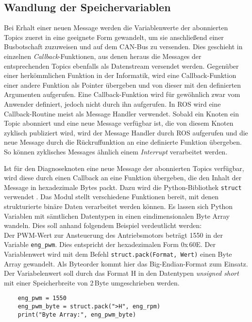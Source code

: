 \subsection{Wandlung der Speichervariablen} \label{subsec:WandlungSpeichervariblen}
Bei Erhalt einer neuen Message werden die Variablenwerte der abonnierten Topics zuerst in eine geeignete Form gewandelt, um sie anschließend einer Busbotschaft zuzuweisen und auf dem CAN-Bus zu versenden. Dies geschieht in einzelnen \emph{Callback}-Funktionen, aus denen heraus die Messages der entsprechenden Topics ebenfalls als Datenstream versendet werden. Gegenüber einer herkömmlichen Funktion in der Informatik, wird eine Callback-Funktion einer andere Funktion als Pointer übergeben und von dieser mit den definierten Argumenten aufgerufen. Eine Callback-Funktion wird für gewöhnlich zwar vom Anwender definiert, jedoch nicht durch ihn aufgerufen. In ROS wird eine Callback-Routine meist als Message Handler verwendet. Sobald ein Knoten ein Topic abonniert und eine neue Message verfügbar ist, die von diesem Knoten zyklisch publiziert wird, wird der Message Handler durch ROS aufgerufen und die neue Message durch die Rückruffunktion an eine definierte Funktion übergeben. So können zyklisches Messages ähnlich einem \emph{Interrupt} verarbeitet werden.

Ist für den Diagnoseknoten eine neue Message der abonnierten Topics verfügbar, wird diese durch einen Callback an eine Funktion übergeben, die den Inhalt der Message in hexadezimale Bytes packt. Dazu wird die Python-Bibliothek \texttt{struct} verwendet \cite{PythonSoftwareFoundation.2018}. Das Modul stellt verschiedene Funktionen bereit, mit denen strukturierte binäre Daten verarbeitet werden können. Es lassen sich Python Variablen mit sämtlichen Datentypen in einen eindimensionalen Byte Array wandeln. Dies soll anhand folgendem Beispiel verdeutlicht werden:\\
Der PWM-Wert zur Ansteuerung des Antriebsmotors beträgt 1550 in der Variable \texttt{eng\_pwm}. Dies entspricht der hexadezimalen Form 0x\,60E. Der Variablenwert wird mit dem Befehl \texttt{struct.pack(\grqq{}Format\grqq{}, \grqq{}Wert\grqq{})} einen Byte Array gewandelt. Als Byteorder kommt hier das Big-Endian-Format zum Einsatz. Der Variabelenwert soll durch das Format H in den Datentypen \emph{unsigned short} mit einer Speicherbreite von 2\,Byte umgeschrieben werden.
\begin{addmargin}[1cm]{0cm} 
	\begin{verbatim}
	eng_pwm = 1550
	eng_pwm_byte = struct.pack(">H", eng_rpm)
	print("Byte Array:", eng_pwm_byte)
	\end{verbatim}
\end{addmargin}

